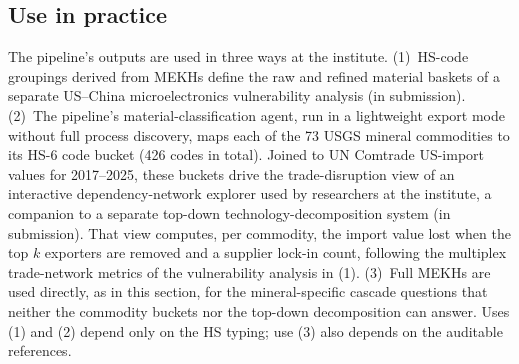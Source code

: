 \subsection{Use in practice}
The pipeline's outputs are used in three ways at the institute. (1)~HS-code groupings derived from MEKHs define the raw and refined material baskets of a separate US--China microelectronics vulnerability analysis (in submission). (2)~The pipeline's material-classification agent, run in a lightweight export mode without full process discovery, maps each of the 73 USGS mineral commodities to its HS-6 code bucket (426 codes in total). Joined to UN Comtrade US-import values for 2017--2025, these buckets drive the trade-disruption view of an interactive dependency-network explorer used by researchers at the institute, a companion to a separate top-down technology-decomposition system (in submission). That view computes, per commodity, the import value lost when the top $k$ exporters are removed and a supplier lock-in count, following the multiplex trade-network metrics of the vulnerability analysis in (1). (3)~Full MEKHs are used directly, as in this section, for the mineral-specific cascade questions that neither the commodity buckets nor the top-down decomposition can answer. Uses (1) and (2) depend only on the HS typing; use (3) also depends on the auditable references.
